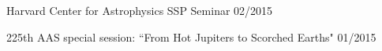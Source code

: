 \documentclass[12pt,letterpaper]{article}
\begin{document}
\begin{list}{}{\cvlist}
\item {Harvard Center for Astrophysics SSP Seminar \hfill 02/2015}
\item {225th AAS special session: ``From Hot Jupiters to Scorched Earths" \hfill 01/2015}
\end{list}


\end{document}
